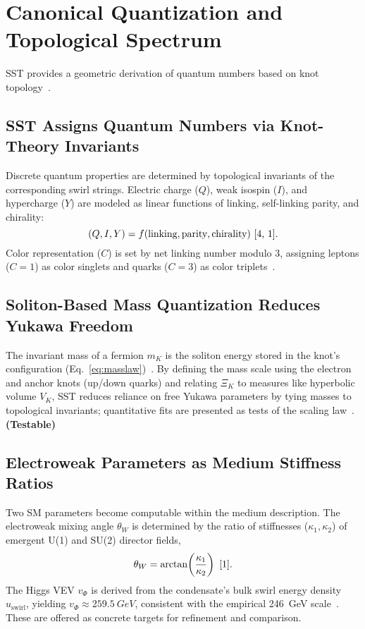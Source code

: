 \documentclass[10pt,reprint,aps,onecolumn,nofootinbib]{revtex4-2}
\newcommand{\testable}{\textbf{(Testable)}}
\begin{document}
\section{Canonical Quantization and Topological Spectrum}
\label{sec:quantization}
SST provides a geometric derivation of quantum numbers based on knot topology~\cite{1,4,17}.

\subsection*{SST Assigns Quantum Numbers via Knot-Theory Invariants}
    Discrete quantum properties are determined by topological invariants of the corresponding swirl strings. Electric charge ($Q$), weak isospin ($I$), and hypercharge ($Y$) are modeled as linear functions of linking, self-linking parity, and chirality:
    \[
        (Q, I, Y) = f(\text{linking}, \text{parity}, \text{chirality})~\cite{4, 1}.
    \]
    Color representation ($C$) is set by net linking number modulo $3$, assigning leptons ($C=1$) as color singlets and quarks ($C=3$) as color triplets~\cite{4}.

\subsection*{Soliton-Based Mass Quantization Reduces Yukawa Freedom}
    The invariant mass of a fermion $m_K$ is the soliton energy stored in the knot’s configuration (Eq.~\ref{eq:masslaw})~\cite{4}. By defining the mass scale using the electron and anchor knots (up/down quarks) and relating $\Xi_K$ to measures like hyperbolic volume $V_K$, SST reduces reliance on free Yukawa parameters by tying masses to topological invariants; quantitative fits are presented as tests of the scaling law~\cite{4}. \testable

\subsection*{Electroweak Parameters as Medium Stiffness Ratios}
    Two SM parameters become computable within the medium description. The electroweak mixing angle $\theta_W$ is determined by the ratio of stiffnesses ($\kappa_1,\kappa_2$) of emergent U(1) and SU(2) director fields,
    \[
        \theta_W = \arctan\!\left(\frac{\kappa_1}{\kappa_2}\right)~\cite{1}.
    \]
    The Higgs VEV $v_\Phi$ is derived from the condensate’s bulk swirl energy density $u_{\text{swirl}}$, yielding $v_\Phi \approx \SI{259.5}{GeV}$, consistent with the empirical \SI{246}{GeV} scale~\cite{1}. These are offered as concrete targets for refinement and comparison.
\end{document}
